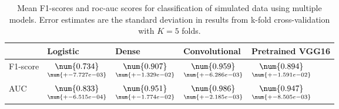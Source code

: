 \begin{table}
\centering
\caption{
Mean F1-scores and roc-auc scores for classification of simulated data using multiple models. 
Error estimates are the standard deviation in results from k-fold cross-validation 
with $K=5$ folds.
}
\label{tab:classification-simulated-f1-auc}
\begin{tabular}{lllll}
\toprule
{} &                                            Logistic &                                               Dense &                                       Convolutional &                                    Pretrained VGG16 \\
\midrule
F1-score &  $\underset{\num{+- 7.727e-03 }  }{\num{ 0.734 } }$ &  $\underset{\num{+- 1.329e-02 }  }{\num{ 0.907 } }$ &  $\underset{\num{+- 6.286e-03 }  }{\num{ 0.959 } }$ &  $\underset{\num{+- 1.591e-02 }  }{\num{ 0.894 } }$ \\
AUC      &  $\underset{\num{+- 6.515e-04 }  }{\num{ 0.833 } }$ &  $\underset{\num{+- 1.774e-02 }  }{\num{ 0.951 } }$ &  $\underset{\num{+- 2.185e-03 }  }{\num{ 0.986 } }$ &  $\underset{\num{+- 8.505e-03 }  }{\num{ 0.947 } }$ \\
\bottomrule
\end{tabular}
\end{table}
